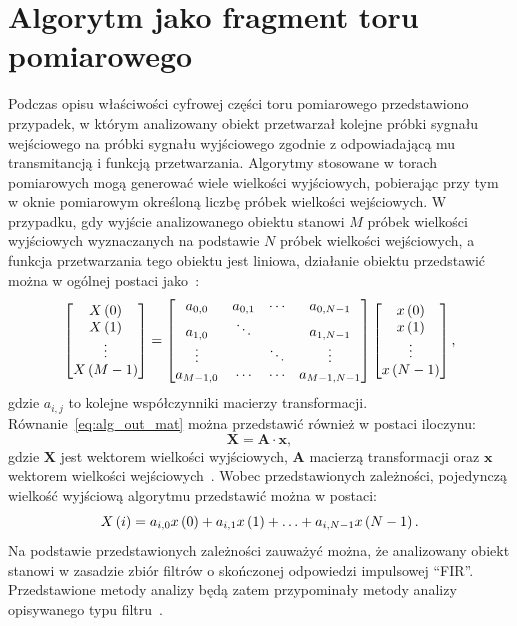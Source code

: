 \section{Algorytm jako fragment toru pomiarowego}

Podczas opisu właściwości cyfrowej części toru pomiarowego przedstawiono przypadek, w którym analizowany obiekt przetwarzał kolejne próbki sygnału wejściowego na próbki sygnału wyjściowego zgodnie z odpowiadającą mu transmitancją i funkcją przetwarzania. Algorytmy stosowane w torach pomiarowych mogą generować wiele wielkości wyjściowych, pobierając przy tym w oknie pomiarowym określoną liczbę próbek wielkości wejściowych. W przypadku, gdy wyjście analizowanego obiektu stanowi $M$ próbek wielkości wyjściowych wyznaczanych na podstawie $N$ próbek wielkości wejściowych, a funkcja przetwarzania tego obiektu jest liniowa, działanie obiektu przedstawić można w ogólnej postaci jako~\cite{jakubiec_algorithms, jakubiec_single}:
\begin{equation}
\begin{bmatrix}
X \left(0\right)   \\
X \left(1\right)   \\
\vdots      \\
X \left(M-1\right)
\end{bmatrix}
=
\begin{bmatrix}
a_{0, 0}   &   a_{0, 1} &   \cdots   &   a_{0, N-1}      \\
a_{1, 0}   &   \ddots   &            &   a_{1, N-1}      \\
\vdots     &            &   \ddots   &   \vdots          \\
a_{M-1, 0} &   \cdots   &   \cdots   &   a_{M-1, N-1}
\end{bmatrix}
\begin{bmatrix}
x \left(0\right)   \\
x \left(1\right)   \\
\vdots      \\
x \left(N-1\right)
\end{bmatrix}
\label{eq:alg_out_mat},
\end{equation}
gdzie $a_{i,j}$ to kolejne współczynniki macierzy transformacji. Równanie~\eqref{eq:alg_out_mat} można przedstawić również w postaci iloczynu:
\begin{equation}
\mathbf{X} = \mathbf{A} \cdot \mathbf{x} \label{eq:alg_out_mul},
\end{equation}
gdzie $\mathbf{X}$ jest wektorem wielkości wyjściowych, $\mathbf{A}$ macierzą transformacji oraz $\mathbf{x}$ wektorem wielkości wejściowych~\cite{jakubiec_algorithms}. Wobec przedstawionych zależności, pojedynczą wielkość wyjściową algorytmu przedstawić można w postaci:
\begin{equation}
X \left(i\right) = a_{i, 0} x \left(0\right) + a_{i, 1} x \left(1\right) + \hdots + a_{i, N-1} x \left(N-1\right) \label{eq:alg_out_single}.
\end{equation}
Na podstawie przedstawionych zależności zauważyć można, że analizowany obiekt stanowi w zasadzie zbiór filtrów o skończonej odpowiedzi impulsowej \enquote{FIR}. Przedstawione metody analizy będą zatem przypominały metody analizy opisywanego typu filtru~\cite{mehrnia_fir}.

